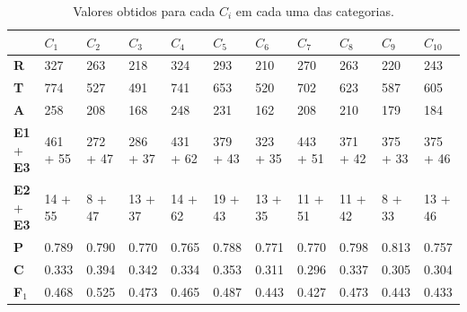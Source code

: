 \documentclass[11pt]{report}
\begin{document}
\begin{table}[h!]
  \centering
  \hspace*{-2.1cm}
  \def\arraystretch{1.1}
  \begin{tabular}{| P{1.45cm} | P{1.36cm} | P{1.36cm} | P{1.36cm} | P{1.36cm} | P{1.36cm} | P{1.36cm} | P{1.36cm} | P{1.36cm} | P{1.36cm} | P{1.36cm} |}
    \hline
     & $C_1$ & $C_2$ & $C_3$ & $C_4$ & $C_5$ & $C_6$ & $C_7$ & $C_8$ & $C_9$ & $C_{10}$ \\
    \hline
    \small{\textbf{R}}                 & \small{327} & \small{263} & \small{218} & \small{324} & \small{293} & \small{210} & \small{270} & \small{263} & \small{220} & \small{243} \\ \hline
    \small{\textbf{T}}                 & \small{774} & \small{527} & \small{491} & \small{741} & \small{653} & \small{520} & \small{702} & \small{623} & \small{587} & \small{605} \\ \hline
    \small{\textbf{A}}   & \small{258} & \small{208} & \small{168} & \small{248} & \small{231} & \small{162} & \small{208} & \small{210} & \small{179} & \small{184} \\ \hline
    \small{\textbf{E1} + \textbf{E3}} & \small{461 + 55} & \small{272 + 47} & \small{286 + 37} & \small{431 + 62} & \small{379 + 43} & \small{323 + 35} & \small{443 + 51} & \small{371 + 42} & \small{375 + 33} & \small{375 + 46} \\ \hline
    \small{\textbf{E2} + \textbf{E3}} & \small{14 + 55} & \small{8 + 47} & \small{13 + 37} & \small{14 + 62} & \small{19 + 43} & \small{13 + 35} & \small{11 + 51} & \small{11 + 42} & \small{8 + 33} & \small{13 + 46} \\ \hline\hline
    \small{\textbf{P}} & \small{0.789} & \small{0.790} & \small{0.770} & \small{0.765} & \small{0.788} & \small{0.771} & \small{0.770} & \small{0.798} & \small{0.813} & \small{0.757} \\ \hline
    \small{\textbf{C}} & \small{0.333} & \small{0.394} & \small{0.342} & \small{0.334} & \small{0.353} & \small{0.311} & \small{0.296} & \small{0.337} & \small{0.305} & \small{0.304} \\ \hline
\small{\textbf{F$_1$}} & \small{0.468} & \small{0.525} & \small{0.473} & \small{0.465} & \small{0.487} & \small{0.443} & \small{0.427} & \small{0.473} & \small{0.443} & \small{0.433} \\ \hline
    \end{tabular}
  \caption{Valores obtidos para cada $C_i$ em cada uma das categorias.}
\end{table}
\end{document}
